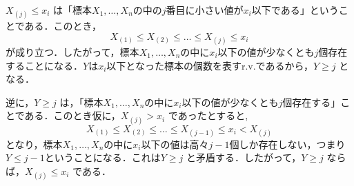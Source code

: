 \documentclass[main.tex]{subfiles}
\begin{document}
\begin{myproofnote}
$X_{(j)} \leq x_i$ は「標本$X_1, \dots, X_n$の中の$j$番目に小さい値が$x_i$以下である」ということである．このとき，
\begin{equation*}
  X_{(1)} \leq X_{(2)} \leq \dots \leq X_{(j)} \leq x_i
\end{equation*}
が成り立つ．したがって，標本$X_1, \dots, X_n$の中に$x_i$以下の値が少なくとも$j$個存在することになる．$Y$は$x_i$以下となった標本の個数を表すr.v.であるから，$Y \geq j$ となる．


逆に，$Y \geq j$ は，「標本$X_1, \dots, X_n$の中に$x_i$以下の値が少なくとも$j$個存在する」ことである．このとき仮に，$X_{(j)} > x_i$ であったとすると,
\begin{equation*}
  X_{(1)} \leq X_{(2)} \leq \dots \leq X_{(j-1)} \leq x_i < X_{(j)}
\end{equation*}
となり，標本$X_1, \dots, X_n$の中に$x_i$以下の値は高々$j-1$個しか存在しない，つまり$Y \leq j-1$ということになる．これは$Y \geq j$ と矛盾する．したがって，$Y \geq j$ ならば，$X_{(j)} \leq x_i$ である．
\end{myproofnote}
\end{document}
